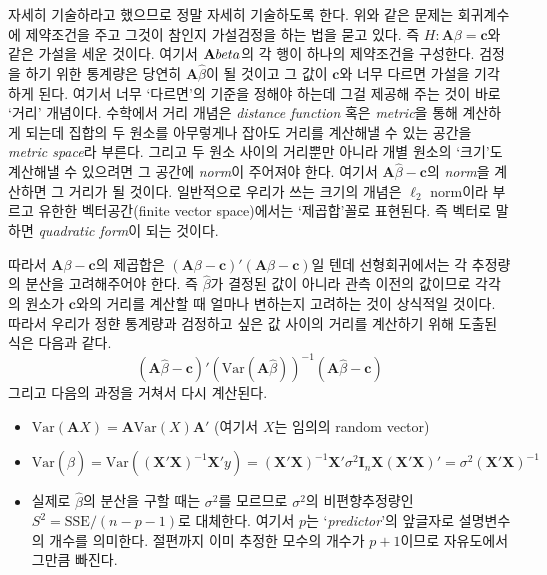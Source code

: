 \documentclass[answers]{exam}
\begin{document}
\begin{questions}
\begin{solution}
    자세히 기술하라고 했으므로 정말 자세히 기술하도록 한다. 위와 같은 문제는 회귀계수에 제약조건을 주고 그것이 참인지 가설검정을 하는 법을 묻고 있다. 즉 $H: \mathbf{A}\beta=\mathbf{c}$와 같은 가설을 세운 것이다. 여기서 $\mathbf{A}\\beta$의 각 행이 하나의 제약조건을 구성한다. 검정을 하기 위한 통계량은 당연히 $\mathbf{A}\widehat{\beta}$이 될 것이고 그 값이 $\mathbf{c}$와 너무 다르면 가설을 기각하게 된다. 여기서 너무 `다르면'의 기준을 정해야 하는데 그걸 제공해 주는 것이 바로 `거리' 개념이다. 수학에서 거리 개념은 \emph{distance function} 혹은 \emph{metric}을 통해 계산하게 되는데 집합의 두 원소를 아무렇게나 잡아도 거리를 계산해낼 수 있는 공간을 \emph{metric space}라 부른다. 그리고 두 원소 사이의 거리뿐만 아니라 개별 원소의 `크기'도 계산해낼 수 있으려면 그 공간에 \emph{norm}이 주어져야 한다. 여기서 $\mathbf{A}\widehat{\beta}-\mathbf{c}$의 \emph{norm}을 계산하면 그 거리가 될 것이다. 일반적으로 우리가 쓰는 크기의 개념은 $\ell_{2}$ norm이라 부르고 유한한 벡터공간(finite vector space)에서는 `제곱합'꼴로 표현된다. 즉 벡터로 말하면 \emph{quadratic form}이 되는 것이다.\par
    따라서 $\mathbf{A}\beta-\mathbf{c}$의 제곱합은 $\left(\mathbf{A}\beta-\mathbf{c}\right)'\left(\mathbf{A}\beta-\mathbf{c}\right)$일 텐데 선형회귀에서는 각 추정량의 분산을 고려해주어야 한다. 즉 $\widehat{\beta}$가 결정된 값이 아니라 관측 이전의 값이므로 각각의 원소가 $\mathbf{c}$와의 거리를 계산할 때 얼마나 변하는지 고려하는 것이 상식적일 것이다. 따라서 우리가 정햔 통계량과 검정하고 싶은 값 사이의 거리를 계산하기 위해 도출된 식은 다음과 같다.
    $$
      \left(\mathbf{A}\widehat{\beta}-\mathbf{c}\right)'\left(\mathrm{Var}\left(\mathbf{A}\widehat{\beta}\right)\right)^{-1}\left(\mathbf{A}\widehat{\beta}-\mathbf{c}\right)
    $$
    그리고 다음의 과정을 거쳐서 다시 계산된다.
    \begin{itemize}
      \item $\mathrm{Var}\left(\mathbf{A}X\right)=\mathbf{A}\mathrm{Var}\left(X\right)\mathbf{A}'$ (여기서 $X$는 임의의 random vector)
      \item $\mathrm{Var}\left(\widehat{\beta}\right) = \mathrm{Var}\left(\left(\mathbf{X}'\mathbf{X}\right)^{-1}\mathbf{X}'y\right)=\left(\mathbf{X}'\mathbf{X}\right)^{-1}\mathbf{X}'\sigma^{2}\mathbf{I}_{n}\mathbf{X}\left(\mathbf{X}'\mathbf{X}\right)'=\sigma^{2}\left(\mathbf{X}'\mathbf{X}\right)^{-1}$
      \item 실제로 $\widehat{\beta}$의 분산을 구할 때는 $\sigma^{2}$를 모르므로 $\sigma^{2}$의 비편향추정량인 $S^{2}=\mathrm{SSE}/\left(n-p-1\right)$로 대체한다. 여기서 $p$는 `\emph{predictor}'의 앞글자로 설명변수의 개수를 의미한다. 절편까지 이미 추정한 모수의 개수가 $p+1$이므로 자유도에서 그만큼 빠진다.

\end{itemize}
\end{solution}
\end{questions}
\end{document}
